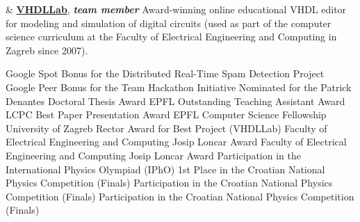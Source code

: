 \documentclass[9pt]{article}
\begin{document}
\begin{easylist}[itemize]
\begin{easylist}
& \href{https://github.com/mbezjak/vhdllab}
{{\bf VHDLLab}},
{\bf \em team member}
\newline Award-winning online educational VHDL editor for modeling and
\newline simulation of digital circuits (used as part of the computer
\newline science curriculum at the Faculty of Electrical Engineering
\newline and Computing in Zagreb since 2007).
\end{easylist}

\bigskip

\medskip
\medskip
\medskip


\noindent Google Spot Bonus for the Distributed Real-Time Spam Detection Project
\newline\noindent Google Peer Bonus for the Team Hackathon Initiative 
\newline\noindent Nominated for the Patrick Denantes Doctoral Thesis Award 
\newline\noindent EPFL Outstanding Teaching Assistant Award 
\newline\noindent LCPC Best Paper Presentation Award 
\newline\noindent EPFL Computer Science Fellowship 
\newline\noindent University of Zagreb Rector Award for Best Project (VHDLLab)
\newline\noindent Faculty of Electrical Engineering and Computing Josip Loncar Award
\newline\noindent Faculty of Electrical Engineering and Computing Josip Loncar Award
\newline\noindent Participation in the International Physics Olympiad (IPhO)
\newline\noindent 1st Place in the Croatian National Physics Competition (Finals)
\newline\noindent Participation in the Croatian National Physics Competition (Finals)
\newline\noindent Participation in the Croatian National Physics Competition (Finals)


\end{easylist}
\end{document}
